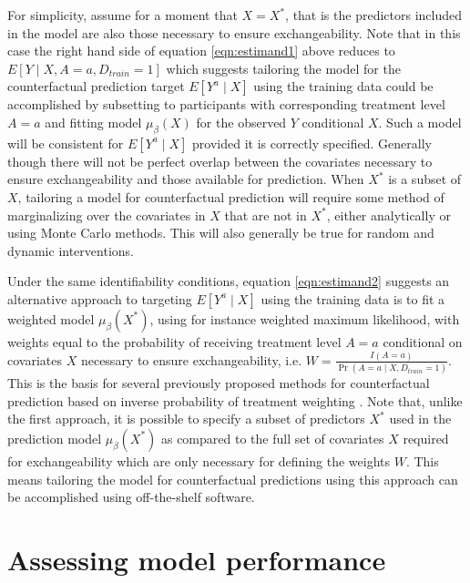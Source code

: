 For simplicity, assume for a moment that $X = X^*$, that is the predictors included in the model are also those necessary to ensure exchangeability. Note that in this case the right hand side of equation \ref{eqn:estimand1} above reduces to $E[Y \mid X, A = a, D_{train} =1]$ which suggests tailoring the model for the counterfactual prediction target $E[Y^a \mid X]$ using the training data could be accomplished by subsetting to participants with corresponding treatment level $A = a$ and fitting model $\mu_\beta(X)$ for the observed $Y$ conditional $X$. Such a model will be consistent for $E[Y^a \mid X]$ provided it is correctly specified. Generally though there will not be perfect overlap between the covariates necessary to ensure exchangeability and those available for prediction. When $X^*$ is a subset of $X$, tailoring a model for counterfactual prediction will require some method of marginalizing over the covariates in $X$ that are not in $X^*$, either analytically or using Monte Carlo methods. This will also generally be true for random and dynamic interventions.

Under the same identifiability conditions, equation \ref{eqn:estimand2} suggests an alternative approach to targeting $E[Y^a \mid X]$ using the training data is to fit a weighted model $\mu_\beta(X^*)$, using for instance weighted maximum likelihood, with weights equal to the probability of receiving treatment level $A = a$ conditional on covariates $X$ necessary to ensure exchangeability, i.e. $W = \frac{I(A = a)}{\Pr(A = a \mid X, D_{train} = 1)}$. This is the basis for several previously proposed methods for counterfactual prediction based on inverse probability of treatment weighting \cite{sperrin_using_2018}. Note that, unlike the first approach, it is possible to specify a subset of predictors $X^*$ used in the prediction model $\mu_\beta(X^*)$ as compared to the full set of covariates $X$ required for exchangeability which are only necessary for defining the weights $W$. This means tailoring the model for counterfactual predictions using this approach can be accomplished using off-the-shelf software.

\section{Assessing model performance} \label{sec:performance}

